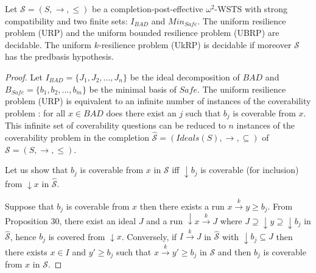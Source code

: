\begin{proposition}\label{down-up}
Let $\mathscr{S}=(S,\rightarrow, \leq)$ be a completion-post-effective $\omega^2$-WSTS with strong compatibility and two finite sets: $I_{BAD}$ and $Min_{Safe}$.
The uniform resilience problem (URP) and the uniform bounded resilience problem (UBRP) are decidable.
The uniform $k$-resilience problem (UkRP) is decidable if moreover $\mathscr{S}$ has the predbasis hypothesis.
\end{proposition}

\begin{proof}
Let $I_{BAD}=\{J_1, J_2,...,J_n\}$ be the ideal decomposition of $BAD$ and $B_{Safe}=\{b_1,b_2,...,b_m\}$ be the minimal basis of $Safe$.
The uniform resilience problem (URP) is equivalent to an infinite number of instances of the coverability problem : for all $x \in BAD$ does there exist an $j$ such that $b_j$ is coverable from $x$. This infinite set of coverability questions can be reduced to $n$ instances of the coverability problem in the completion $\hat{\mathscr{S}}=(Ideals(S),\rightarrow, \subseteq)$ of $\mathscr{S}=(S,\rightarrow, \leq)$.


Let us show that $b_j$ is coverable from $x$ in $\mathscr{S}$ iff $\downarrow b_j$ is coverable (for inclusion) from $\downarrow x$ in $\hat{\mathscr{S}}$.

Suppose that $b_j$ is coverable from $x$ then there exists a run $x \xrightarrow{k} y \geq b_j$. From Proposition 30, there exist an ideal $J$ and a run $\downarrow x \xrightarrow{k} J$ where $J \supseteq \downarrow y \supseteq \downarrow b_j$ in $\hat{\mathscr{S}}$, hence $b_j$ is covered from $\downarrow x$.
Conversely, if $I \xrightarrow{k} J$ in $\hat{\mathscr{S}}$ with $\downarrow b_j \subseteq J$ then 
there exists $x \in I$ and $y' \geq b_j$ such that $x \xrightarrow{k} y'  \geq b_j$ in $\mathscr{S}$ and then $b_j$ is coverable from $x$ in $\mathscr{S}$.


\end{proof}
